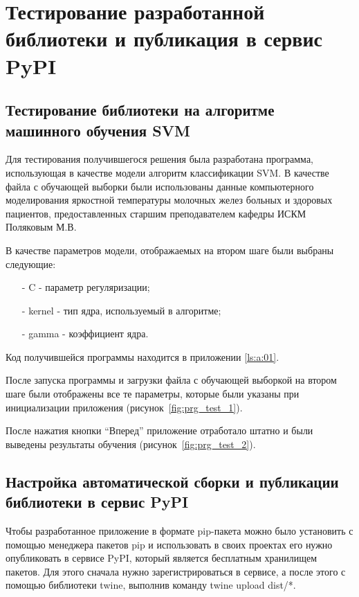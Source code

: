 \chapter{Тестирование разработанной библиотеки и публикация в сервис PyPI}\vspace{-7mm}

\section{Тестирование библиотеки на алгоритме машинного обучения SVM}
Для тестирования получившегося решения была разработана программа, использующая в качестве модели алгоритм классификации SVM. В качестве файла с обучающей выборки были использованы данные компьютерного моделирования яркостной температуры молочных желез больных и здоровых пациентов, предоставленных старшим преподавателем кафедры ИСКМ Поляковым М.В.


В качестве параметров модели, отображаемых на втором шаге были выбраны следующие:
\begin{itemize}
	\item[-] C - параметр регуляризации;
	\item[-] kernel - тип ядра, используемый в алгоритме;
	\item[-] gamma - коэффициент ядра.
\end{itemize}


Код получившейся программы находится в приложении \ref{ls:a:01}.


После запуска программы и загрузки файла с обучающей выборкой на втором шаге были отображены все те параметры, которые были указаны при инициализации приложения (рисунок~\ref{fig:prg_test_1}).




После нажатия кнопки “Вперед” приложение отработало штатно и были выведены результаты обучения (рисунок~\ref{fig:prg_test_2}).



\section{Настройка автоматической сборки и публикации библиотеки в сервис PyPI}

Чтобы разработанное приложение в формате pip-пакета можно было установить с помощью менеджера пакетов pip и использовать в своих проектах его нужно опубликовать в сервисе PyPI, который является бесплатным хранилищем пакетов. Для этого сначала нужно зарегистрироваться в сервисе, а после этого с помощью библиотеки twine, выполнив команду twine upload dist/*. 


